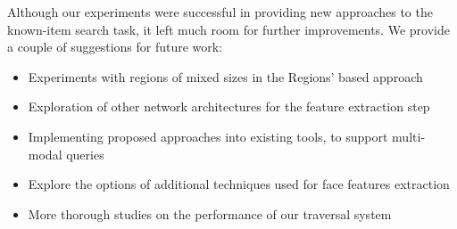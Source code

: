 Although our experiments were successful in providing new approaches to the known-item search task, it left much room for further improvements. We provide a couple of suggestions for future work:

\begin{itemize}
    \item Experiments with regions of mixed sizes in the Regions' based approach
    \item Exploration of other network architectures for the feature extraction step
    \item Implementing proposed approaches into existing tools, to support multi-modal queries
    \item Explore the options of additional techniques used for face features extraction
    \item More thorough studies on the performance of our traversal system
\end{itemize}


